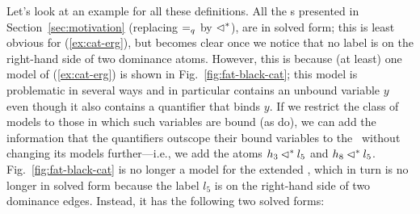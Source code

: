 Let's look at an example for all these definitions.  All the \rmrs s
presented in Section~\ref{sec:motivation} (replacing $=_q$ by
$\lhd^*$), are in solved form; this is least obvious for
(\ref{ex:cat-erg}), but becomes clear once we notice that no label is
on the right-hand side of two dominance atoms.  However, this is
because (at least) one model of (\ref{ex:cat-erg}) is
shown in Fig.~\ref{fig:fat-black-cat}; this model
is problematic in several ways and in particular contains an unbound
variable $y$ even though it also contains a quantifier that binds $y$.
If we restrict the class of models to those in 
which such variables are bound (as  do),
we can add the information that the 
quantifiers outscope their bound variables to the \rmrs\ without
changing its models further---i.e., we add the atoms $h_3 \lhd^*
l_5$ and $h_8 \lhd^* l_5$.  Fig.~\ref{fig:fat-black-cat} is no longer a
model for the extended \rmrs, which in turn is no longer in solved
form because the label $l_5$ is on the right-hand side of two
dominance edges.  Instead, it has the following two solved forms:


